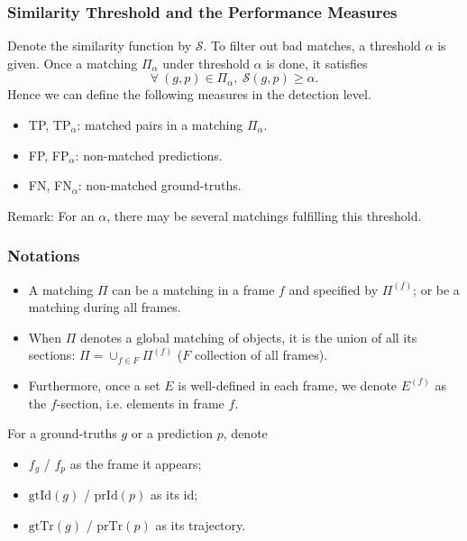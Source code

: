 \documentclass[slidetop, mathserif, dvipsnames]{beamer}
\begin{document}
\begin{frame}
	\frametitle{Similarity Threshold and the Performance Measures}
		
	Denote the similarity function by $\mathcal S$.
	To filter out bad matches, a threshold $\alpha$ is given.
	Once a matching $\Pi_\alpha$ under threshold $\alpha$ is done, it satisfies
	\[
		\forall\ (g,p)\in\Pi_\alpha, ~ \mathcal S(g,p) \geq \alpha.
	\]
	Hence we can define the following measures in the detection level.
	\begin{itemize}
		\item TP, TP$_\alpha$: matched pairs in a matching $\Pi_\alpha$.
		\item FP, FP$_\alpha$: non-matched predictions.
		\item FN, FN$_\alpha$: non-matched ground-truths.
	\end{itemize}
	{\color{red} Remark: For an $\alpha$, there may be several matchings fulfilling this threshold.}
\end{frame}

\begin{frame}
	\frametitle{Notations}
			
	\begin{itemize}
		\item A matching $\Pi$ can be a matching in a frame $f$ and specified by $\Pi^{(f)}$;
		      or be a matching during all frames.
		\item When $\Pi$ denotes a global matching of objects, it is the union of all its sections:
		      $\Pi = \cup_{f\in F}\Pi^{(f)}$ ($F$ collection of all frames).
		\item Furthermore, once a set $E$ is well-defined in each frame,
		      we denote $E^{(f)}$ as the $f$-section, i.e. elements in frame $f$.
		      		      		      
	\end{itemize}
			
	\vspace{-2pt}

	For a ground-truths $g$ or a prediction $p$, denote
	\begin{itemize}
		\item $f_g$ / $f_p$ as the frame it appears;
		\item $\text{gtId}(g)$ / $\text{prId}(p)$ as its id;
		\item $\text{gtTr}(g)$ / $\text{prTr}(p)$ as its trajectory.
	\end{itemize}

\end{frame}
\end{document}
